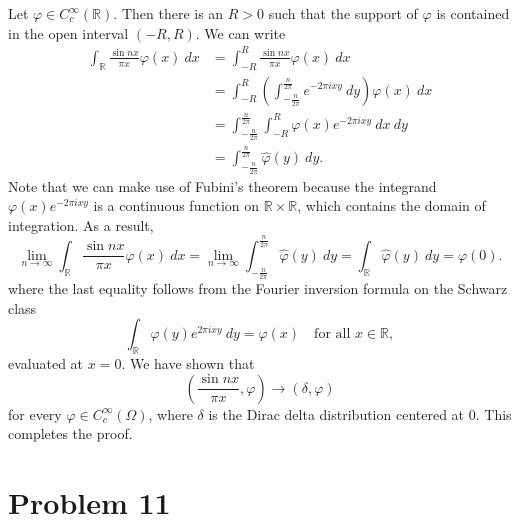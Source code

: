 \documentclass[10pt]{amsart}
\theoremstyle{thmstyle}
\theoremstyle{defstyle}
\newcommand{\R}{\mathbb{R}}
\newcommand{\wh}[1]{\widehat{#1}}
\begin{document}
Let $\varphi\in C_c^\infty(\R)$. Then there is an $R > 0$ such that the support of $\varphi$ is contained in the open interval $(-R, R)$. We can write 
\begin{align*}
	\int_{\R}\frac{\sin nx}{\pi x}\varphi(x)~dx &= \int_{-R}^R\frac{\sin nx}{\pi x}\varphi(x)~dx\\
	&= \int_{-R}^R\left(\int_{-\frac{n}{2\pi}}^{\frac{n}{2\pi}}e^{-2\pi ixy}~dy\right)\varphi(x)~dx\\
	&= \int_{-\frac{n}{2\pi}}^\frac{n}{2\pi}\int_{-R}^R\varphi(x)e^{-2\pi i xy}~dx~dy\\
	&= \int_{-\frac{n}{2\pi}}^{\frac{n}{2\pi}}\wh\varphi(y)~dy.
\end{align*}
Note that we can make use of Fubini's theorem because the integrand $\varphi(x)e^{-2\pi i xy}$ is a continuous function on $\R\times\R$, which contains the domain of integration. As a result,
\begin{equation*}
	\lim_{n\to\infty}\int_{\R}\frac{\sin nx}{\pi x}\varphi(x)~dx = \lim_{n\to\infty}\int_{-\frac{n}{2\pi}}^{\frac{n}{2\pi}}\wh\varphi(y)~dy = \int_{\R}\wh\varphi(y)~dy = \varphi(0).
\end{equation*}
where the last equality follows from the Fourier inversion formula on the Schwarz class 
\begin{equation*}
	\int_{\R}\wh\varphi(y)e^{2\pi i xy}~dy = \varphi(x)\quad\text{for all }x\in\R,
\end{equation*}
evaluated at $x = 0$. We have shown that 
\begin{equation*}
	\left(\frac{\sin nx}{\pi x},\varphi\right)\to(\delta,\varphi)
\end{equation*}
for every $\varphi\in C_c^\infty(\Omega)$, where $\delta$ is the Dirac delta distribution centered at $0$. This completes the proof.

\section{Problem 11}\label{problem-11}
\end{document}
